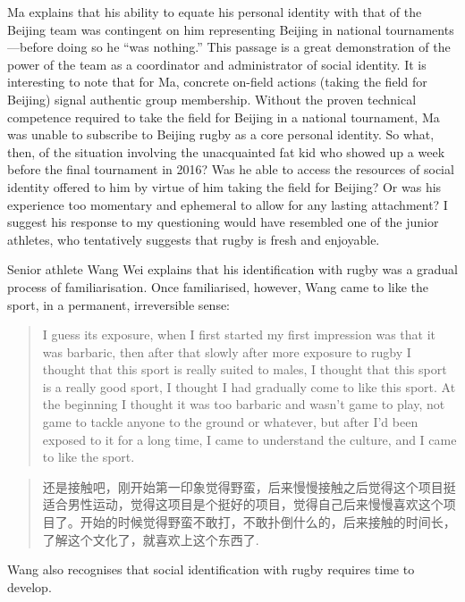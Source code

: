 \begin{CJK}{UTF8}{gbsn}
Ma explains that his ability to equate his personal identity with that of the Beijing team was contingent on him representing Beijing in national tournaments---before doing so he ``was nothing.''  This passage is a great demonstration of the power of the team as a coordinator and administrator of social identity.  It is interesting to note that for Ma, concrete on-field actions (taking the field for Beijing) signal authentic group membership.  Without the proven technical competence required to take the field for Beijing in a national tournament, Ma was unable to subscribe to Beijing rugby as a core personal identity.  So what, then, of the situation involving the unacquainted fat kid who showed up a week before the final tournament in 2016?  Was he able to access the resources of social identity offered to him by virtue of him taking the field for Beijing? Or was his experience too momentary and ephemeral to allow for any lasting attachment?  I suggest his response to my questioning would have resembled one of the junior athletes, who tentatively suggests that rugby is fresh and enjoyable.

Senior athlete Wang Wei explains that his identification with rugby was a gradual process of familiarisation. Once familiarised, however, Wang came to like the sport, in a permanent, irreversible sense:

  \begin{quotation}
    I guess its exposure, when I first started my first impression was that it was barbaric, then after that slowly after more exposure to rugby I thought that this sport is really suited to males, I thought that this sport is a really good sport, I thought I had gradually come to like this sport.  At the beginning I thought it was too barbaric and wasn’t game to play, not game to tackle anyone to the ground or whatever, but after I’d been exposed to it for a long time, I came to understand the culture, and I came to like the sport.
  \end{quotation}

  \begin{quotation}
    还是接触吧，刚开始第一印象觉得野蛮，后来慢慢接触之后觉得这个项目挺适合男性运动，觉得这项目是个挺好的项目，觉得自己后来慢慢喜欢这个项目了。开始的时候觉得野蛮不敢打，不敢扑倒什么的，后来接触的时间长，了解这个文化了，就喜欢上这个东西了.
  \end{quotation}

Wang also recognises that social identification with rugby requires time to develop.



\end{CJK}

